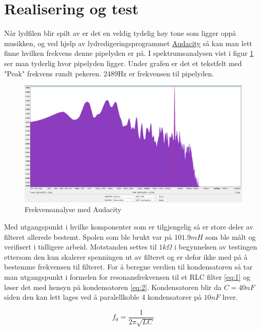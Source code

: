 \newpage
\section{Realisering og test}
\label{realiseringOgTest}


Når lydfilen blir spilt av er det en veldig tydelig høy tone som ligger oppå musikken, og ved hjelp av lydredigeringsprogrammet \href{https://www.audacityteam.org/}{Audacity} så kan man lett finne hvilken frekvens denne pipelyden er på. I spektrumsanalysen vist i figur \ref{fig:fig3} ser man tyderlig hvor pipelyden ligger. Under grafen er det et tekstfelt med "Peak" frekvens rundt pekeren. 2489Hz er frekvensen til pipelyden. 


\begin{figure}[!h]
	\centering
	\includegraphics[width=1\textwidth]{Bilder/Audio_sectrum.png}
	\caption{Frekvensanalyse med Audacity}
	\label{fig:fig3}
\end{figure}

Med utgangspunkt i hvilke komponenter som er tilgjengelig så er store deler av filteret allerede bestemt. Spolen som ble brukt var på $101.9mH$ som ble målt og verifisert i tidligere arbeid. Motstanden settes til $1k\Omega$ i begynnelsen av testingen ettersom den kun skalerer spenningen ut av filteret og er defor ikke med på å bestemme frekvensen til filteret. For å beregne verdien til kondensatoren så tar man utgangspunkt i formelen for resonansfrekvensen til et RLC filter \ref{eq:1} og løser det med hensyn på kondensatoren \ref{eq:2}. Kondensatoren blir da $C = 40nF$ siden den kan lett lages ved å paralellkoble 4 kondensatorer på $10nF$ hver.

\begin{equation}
	f_0 = \frac{1}{2\pi \sqrt{LC}}
	\label{eq:1}
\end{equation}


